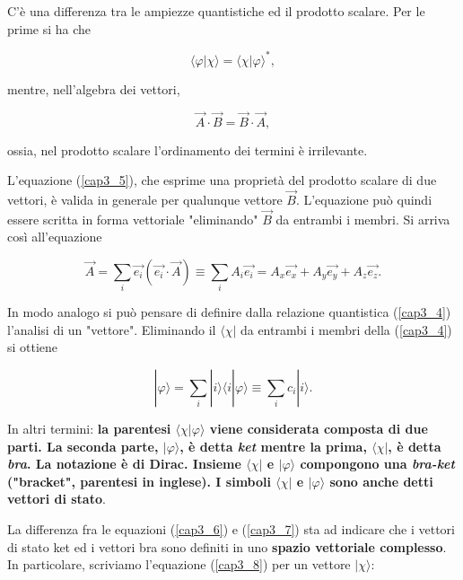 C'è una differenza tra le ampiezze quantistiche ed il prodotto scalare. Per le prime si ha che

\begin{equation}
\langle \varphi | \chi \rangle = \langle \chi | \varphi\rangle ^* ,
\label{cap3_6}
\end{equation} 

mentre, nell'algebra dei vettori, 

\begin{equation}
\vec{A} \cdot \vec{B}= \vec{B} \cdot \vec{A} ,
\label{cap3_7}
\end{equation}

ossia, nel prodotto scalare l'ordinamento dei termini è irrilevante.

L'equazione (\ref{cap3_5}), che esprime una proprietà del prodotto scalare di due vettori, è valida in generale per qualunque vettore $\vec{B}$. L'equazione può quindi essere scritta in forma vettoriale "eliminando" $\vec{B}$ da entrambi i membri. Si arriva così all'equazione 

\begin{equation}
\vec{A} = \sum \limits_{i} \vec{e_i} (\vec{e_i}\cdot\vec{A}) \equiv \sum \limits_{i} A_i\vec{e_i}= A_x\vec{e_x}+A_y\vec{e_y}+A_z\vec{e_z} .
\end{equation}

In modo analogo si può pensare di definire dalla relazione quantistica (\ref{cap3_4}) l'analisi di un "vettore". Eliminando il $\langle \chi |$ da entrambi i membri della (\ref{cap3_4}) si ottiene

\begin{equation}
 | \varphi \rangle= \sum \limits_{i} | i \rangle \langle i | \varphi \rangle \equiv \sum \limits_{i} c_i | i \rangle .
\label{cap3_8}
\end{equation}

In altri termini: \textbf{la parentesi $\langle \chi | \varphi \rangle $ viene considerata composta di due parti. La seconda parte, $| \varphi \rangle $, è detta \emph{ket} mentre la prima, $\langle \chi |$, è detta \emph{bra}. La notazione è di Dirac. Insieme $\langle \chi |$ e $| \varphi \rangle$ compongono una \emph{bra-ket} ("bracket", parentesi in inglese). I simboli $\langle \chi |$ e $| \varphi \rangle$ sono anche detti vettori di stato}.

La differenza fra le equazioni (\ref{cap3_6}) e (\ref{cap3_7}) sta ad indicare che i vettori di stato ket ed i vettori bra sono definiti in uno \textbf{spazio vettoriale complesso}. In particolare, scriviamo l'equazione (\ref{cap3_8}) per un vettore $| \chi\rangle$:

